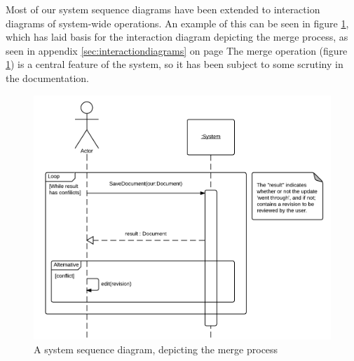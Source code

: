 Most of our system sequence diagrams have been extended to interaction diagrams of system-wide operations. 
An example of this can be seen in figure \ref{fig:merge-ssd}, 
which has laid basis for the interaction diagram depicting the merge process, 
as seen in appendix \ref{sec:interactiondiagrams} on page \pageref{fig:interaction-merge-diagram}
The merge operation (figure \ref{fig:merge-ssd}) is a central feature of the \SOP 
system, so it has been subject to some scrutiny in the documentation.


\begin{figure}[hbt]
	\centering
	\includegraphics[width=1\textwidth]{Software_analysis/graphics/Merge-ssd.png}
	\caption{A system sequence diagram, depicting the merge process}
	\label{fig:merge-ssd}
\end{figure}
